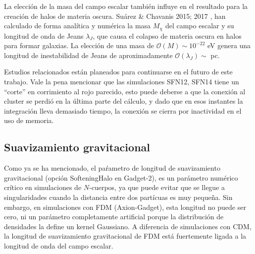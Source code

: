 \documentclass[a4paper,openright,12pt]{book}
\begin{document}
La elección de la masa del campo escalar también influye en el resultado para la creación de halos de materia oscura. Suárez \& Chavanis 2015; 2017 \cite{4.3.6, 4.3.7}, han calculado de forma analítica y numérica la masa $M_{\chi}$ del campo escalar y su longitud de onda de Jeans $\lambda_{J}$, que causa el colapso de materia oscura en halos para formar galaxias. La elección de una masa de $\mathcal{O}(M)\sim 10^{-22}$ eV  genera una longitud de inestabilidad de Jeans de aproximadamente $\mathcal{O}(\lambda_{J})\sim$ pc.

Estudios relacionados están planeados para continuarse en el futuro de este trabajo. Vale la pena mencionar que las simulaciones SFN12, SFN14 tiene un ``corte'' en corrimiento al rojo parecido, esto puede deberse a que la conexión al cluster se perdió en la última parte del cálculo, y dado que en esos instantes la integración lleva demasiado tiempo, la conexión se cierra por inactividad en el uso de memoria.

\subsection*{Suavizamiento gravitacional}
Como ya se ha mencionado, el paŕametro de longitud de suavizamiento gravitacional (opción \textsf{SofteningHalo} en Gadget-2), es un parámetro numérico crítico en simulaciones de $N$-cuerpos, ya que puede evitar que se llegue a singularidades cuando la distancia entre dos partícuas es muy pequeña. Sin embargo, en simulaciones con FDM (Axion-Gadget), esta longitud no puede ser cero, ni un parámetro completamente artificial porque la distribución de densidades la define un kernel Gaussiano. A diferencia de simulaciones con CDM, la longitud de suavizamiento gravitacional de FDM está fuertemente ligada a la longitud de onda del campo escalar.
\end{document}
